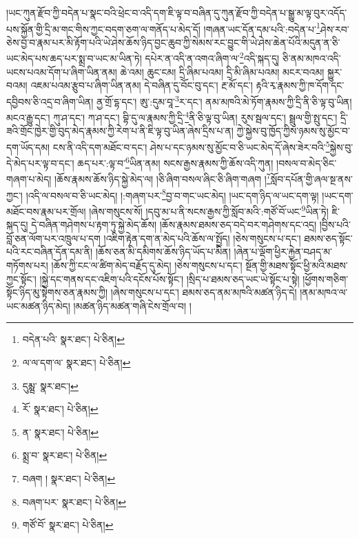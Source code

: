 །ཡང་ཀུན་རྫོབ་ཀྱི་བདེན་པ་སྣང་བའི་ཕྲེང་བ་འདི་དག་ཇི་ལྟ་བ་བཞིན་དུ་ཀུན་རྫོབ་ཀྱི་བདེན་པ་སྒྱུ་མ་ལྟ་བུར་འདོད་པས་སྐྱོན་གྱི་དྲི་མ་གང་གིས་ཀྱང་བདག་ཅག་ལ་གནོད་པ་མེད་དོ། །གཞན་ཡང་དོན་དམ་པའི་:བདེན་པ་\footnote{བདེན་པའི་  སྣར་ཐང་།  པེ་ཅིན། }ཤེས་རབ་ཅེས་བྱ་བ་རྣམ་པར་མི་རྟོག་པའི་ཡེ་ཤེས་ཆོས་ཉིད་བྱང་ཆུབ་ཀྱི་སེམས་རང་བྱུང་གི་ཡེ་ཤེས་ཆེན་པོའི་མདུན་ན་ཅི་ཡང་མེད་པས་ཆད་པར་སྨྲ་བ་ཡང་མ་ཡིན་ཏེ། དཔེར་ན་འདི་ན་འགའ་ཞིག་ལ་\footnote{ལ་ལ་དག་ལ་  སྣར་ཐང་།  པེ་ཅིན། }འདི་སྐད་དུ། ཅི་ནམ་མཁའ་འདི་ཡངས་པའམ་དོག་པ་ཞིག་ཡིན་ནམ། ཆེ་འམ། ཆུང་ངམ། དྲི་ཞིམ་པའམ། དྲི་མི་ཞིམ་པའམ། མངར་བའམ། སྐྱུར་བའམ། འཇམ་པའམ་རྩུབ་པ་ཞིག་ཡིན་ནམ། དེ་བཞིན་དུ་བོང་བུ་དང་། རྔ་མོ་དང་། རྟའི་རྭ་རྣམས་ཀྱི་ཁ་དོག་དང་དབྱིབས་ཅི་འདྲ་བ་ཞིག་ཡིན། ནྱ་གྲོ་དྷ་དང་། ཨུ་:དུམ་བཱ་\footnote{དུམྺ་  སྣར་ཐང་། }ར་དང་། ནམ་མཁའི་མེ་ཏོག་རྣམས་ཀྱི་དྲི་ནི་ཅི་ལྟ་བུ་ཡིན། མངའ་རྒྱུ་དང་། ཀུ་ཤ་དང་། ཀ་ཤ་དང་། བྷི་དུ་ལ་རྣམས་ཀྱི་དྲི་\footnote{རོ་  སྣར་ཐང་།  པེ་ཅིན། }ནི་ཅི་ལྟ་བུ་ཡིན། རུས་སྦལ་དང་། སྦྲུལ་གྱི་སྤུ་དང་། དྲི་ཟའི་གྲོང་ཁྱེར་གྱི་བུད་མེད་རྣམས་ཀྱི་རེག་པ་ནི་ཇི་ལྟ་བུ་ཡིན་ཞེས་དྲིས་པ་ན། ཀྱེ་སྐྱེས་བུ་ཁྱོད་ཀྱིས་ཉམས་སུ་མྱོང་བ་དག་ཡོད་དམ། ངས་ནི་འདི་དག་མཐོང་བ་དང་། ཤེས་པ་དང་ཉམས་སུ་མྱོང་བ་ཅི་ཡང་མེད་དོ་ཞེས་ཟེར་བའི་\footnote{ན་  སྣར་ཐང་།  པེ་ཅིན། }སྐྱེས་བུ་དེ་མེད་པར་ལྟ་བ་དང་། ཆད་པར་:ལྟ་བ་\footnote{སྨྲ་བ་  སྣར་ཐང་།  པེ་ཅིན། }ཡིན་ནམ། སངས་རྒྱས་རྣམས་ཀྱི་ཆོས་འདི་ཀུན། །བསལ་བ་མེད་ཅིང་གཞག་པ་མེད། །ཆོས་རྣམས་ཆོས་ཉིད་སྐྱེ་མེད་ལ། །ཅི་ཞིག་བསལ་ཞིང་ཅི་ཞིག་གཞག །\footnote{བཞག །  སྣར་ཐང་།  པེ་ཅིན། }སློབ་དཔོན་གྱི་ཞལ་སྔ་ནས་ཀྱང་། །འདི་ལ་བསལ་བ་ཅི་ཡང་མེད། །:གཞག་པར་\footnote{བཞག་པར་  སྣར་ཐང་།  པེ་ཅིན། }བྱ་བ་གང་ཡང་མེད། །ཡང་དག་ཉིད་ལ་ཡང་དག་ལྟ། །ཡང་དག་མཐོང་བས་རྣམ་པར་གྲོལ། །ཞེས་གསུངས་སོ། །དབུ་མ་པ་ནི་སངས་རྒྱས་ཀྱི་སློབ་མའི་:གཙོ་བོ་ཡང་\footnote{གཙོ་བོ་  སྣར་ཐང་།  པེ་ཅིན། }ཡིན་ཏེ། ཇི་སྐད་དུ། དེ་བཞིན་གཤེགས་པ་རྟག་ཏུ་སྐྱེ་མེད་ཆོས། །ཆོས་རྣམས་ཐམས་ཅད་བདེ་བར་གཤེགས་དང་འདྲ། །བྱིས་པའི་བློ་ཅན་ལོག་པར་འཁྲུལ་པ་དག །འཇིག་རྟེན་དག་ན་མེད་པའི་ཆོས་ལ་སྤྱོད། །ཅེས་གསུངས་པ་དང་། ཐམས་ཅད་སྟོང་པའི་རང་བཞིན་དོན་དམ་ནི། །ཆོས་ཅན་མི་དམིགས་ཆོས་ཉིད་ཡོད་པ་མིན། །ཞེན་པ་ལྡོག་ཕྱིར་རྐྱེན་བཤད་མ་གཏོགས་པར། །ཆོས་ཀྱི་ངང་ལ་ཚིག་མེད་བརྗོད་དུ་མེད། །ཅེས་གསུངས་པ་དང་། སྔོན་གྱི་མཐས་སྟོང་ཕྱི་མའི་མཐས་ཀྱང་སྟོང་། །སྐྱེ་དང་གནས་དང་འཇིག་པའི་དངོས་པོས་སྟོང་། །སྲིད་པ་ཐམས་ཅད་ཡང་ཡེ་སྟོང་པ་སྟེ། །ཕྱོགས་གཅིག་སྟོང་ཉིད་མུ་སྟེགས་ཅན་རྣམས་ཀྱི། །ཞེས་གསུངས་པ་དང་། ཐམས་ཅད་ནམ་མཁའི་མཚན་ཉིད་དེ། །ནམ་མཁའ་ལ་ཡང་མཚན་ཉིད་མེད། །མཚན་ཉིད་མཚན་གཞི་ངེས་གྲོལ་བ། །
